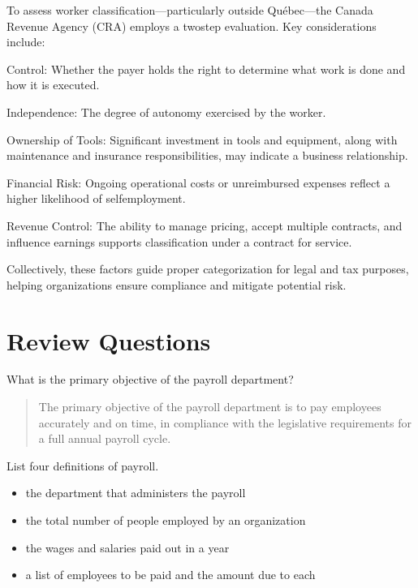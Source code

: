 \documentclass[letterpaper,10pt,english]{sphinxmanual}
\begin{document}
\sphinxAtStartPar
To assess worker classification—particularly outside Québec—the Canada Revenue Agency (CRA) employs a two\sphinxhyphen{}step evaluation. Key
considerations include:

\sphinxAtStartPar
Control: Whether the payer holds the right to determine what work is done and how it is executed.

\sphinxAtStartPar
Independence: The degree of autonomy exercised by the worker.

\sphinxAtStartPar
Ownership of Tools: Significant investment in tools and equipment, along with maintenance and insurance responsibilities, may indicate a business relationship.

\sphinxAtStartPar
Financial Risk: Ongoing operational costs or unreimbursed expenses reflect a higher likelihood of self\sphinxhyphen{}employment.

\sphinxAtStartPar
Revenue Control: The ability to manage pricing, accept multiple contracts, and influence earnings supports classification under a contract for service.

\sphinxAtStartPar
Collectively, these factors guide proper categorization for legal and tax purposes, helping organizations ensure compliance and mitigate potential risk.


\section{Review Questions}
\label{\detokenize{3_contracts:review-questions}}
\sphinxAtStartPar
What is the primary objective of the payroll department?
\begin{quote}

\sphinxAtStartPar
The primary objective of the payroll department is to pay employees accurately and
on time, in compliance with the legislative requirements for a full annual payroll
cycle.
\end{quote}

\sphinxAtStartPar
List four definitions of payroll.
\begin{itemize}
\item {} 
\sphinxAtStartPar
the department that administers the payroll

\item {} 
\sphinxAtStartPar
the total number of people employed by an organization

\item {} 
\sphinxAtStartPar
the wages and salaries paid out in a year

\item {} 
\sphinxAtStartPar
a list of employees to be paid and the amount due to each

\end{itemize}
\end{document}
